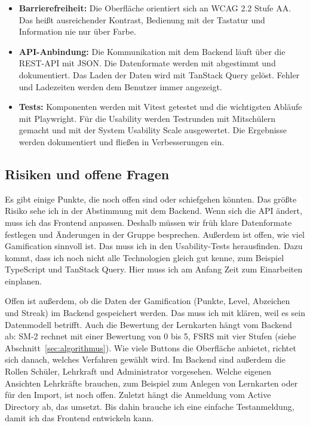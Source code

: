 \begin{itemize}
    \item \textbf{Barrierefreiheit:} Die Oberfläche orientiert sich an WCAG 2.2 Stufe AA. Das heißt ausreichender Kontrast, Bedienung mit der Tastatur und Information nie nur über Farbe.
    \item \textbf{API-Anbindung:} Die Kommunikation mit dem Backend läuft über die REST-API mit JSON. Die Datenformate werden mit \Luca abgestimmt und dokumentiert. Das Laden der Daten wird mit TanStack Query gelöst. Fehler und Ladezeiten werden dem Benutzer immer angezeigt.
    \item \textbf{Tests:} Komponenten werden mit Vitest getestet und die wichtigsten Abläufe mit Playwright. Für die Usability werden Testrunden mit Mitschülern gemacht und mit der System Usability Scale ausgewertet. Die Ergebnisse werden dokumentiert und fließen in Verbesserungen ein.
\end{itemize}
 
\subsection{Risiken und offene Fragen}
 
Es gibt einige Punkte, die noch offen sind oder schiefgehen könnten. Das größte Risiko sehe ich in der Abstimmung mit dem Backend. Wenn sich die API ändert, muss ich das Frontend anpassen. Deshalb müssen wir früh klare Datenformate festlegen und Änderungen in der Gruppe besprechen. Außerdem ist offen, wie viel Gamification sinnvoll ist. Das muss ich in den Usability-Tests herausfinden. Dazu kommt, dass ich noch nicht alle Technologien gleich gut kenne, zum Beispiel TypeScript und TanStack Query. Hier muss ich am Anfang Zeit zum Einarbeiten einplanen. 

Offen ist außerdem, ob die Daten der Gamification (Punkte, Level, Abzeichen und Streak) im Backend gespeichert werden. Das muss ich mit \Luca klären, weil es sein Datenmodell betrifft. Auch die Bewertung der Lernkarten hängt vom Backend ab: SM-2 rechnet mit einer Bewertung von 0 bis 5, FSRS mit vier Stufen (siehe Abschnitt~\ref{sec:algorithmus}). Wie viele Buttons die Oberfläche anbietet, richtet sich danach, welches Verfahren gewählt wird. Im Backend sind außerdem die Rollen Schüler, Lehrkraft und Administrator vorgesehen. Welche eigenen Ansichten Lehrkräfte brauchen, zum Beispiel zum Anlegen von Lernkarten oder für den Import, ist noch offen. Zuletzt hängt die Anmeldung vom Active Directory ab, das \Jai umsetzt. Bis dahin brauche ich eine einfache Testanmeldung, damit ich das Frontend entwickeln kann.
 
